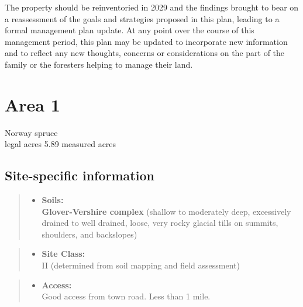 \documentclass[]{tufte-handout}
\providecommand{\tightlist}{%
  \setlength{\itemsep}{0pt}\setlength{\parskip}{0pt}}
\begin{document}
The property should be reinventoried in 2029 and the findings brought to
bear on a reassessment of the goals and strategies proposed in this
plan, leading to a formal management plan update. At any point over the
course of this management period, this plan may be updated to
incorporate new information and to reflect any new thoughts, concerns or
considerations on the part of the family or the foresters helping to
manage their land.

\newpage

\section{Area 1}\label{area-1}

Norway spruce\\
 legal acres \textbar{} 5.89 measured acres

\subsection{Site-specific information}\label{site-specific-information}

\begin{quote}
\begin{itemize}
\tightlist
\item
  \textbf{Soils:}\\
  \indent\indent  \textbf{Glover-Vershire complex} (shallow to
  moderately deep, excessively drained to well drained, loose, very
  rocky glacial tills on summits, shoulders, and backslopes)
\end{itemize}
\end{quote}

\begin{quote}
\begin{itemize}
\tightlist
\item
  \textbf{Site Class:}\\
  \vspace{2pt} II (determined from soil mapping and field assessment)
\end{itemize}
\end{quote}

\begin{quote}
\begin{itemize}
\tightlist
\item
  \textbf{Access:}\\
  \vspace{2pt} Good access from town road. Less than 1 mile.
\end{itemize}
\end{quote}
\end{document}

